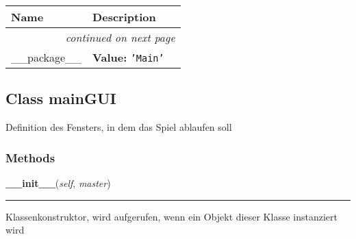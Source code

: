     \vspace{-1cm}
\hspace{\varindent}\begin{longtable}{|p{\varnamewidth}|p{\vardescrwidth}|l}
\cline{1-2}
\cline{1-2} \centering \textbf{Name} & \centering \textbf{Description}& \\
\cline{1-2}
\endhead\cline{1-2}\multicolumn{3}{r}{\small\textit{continued on next page}}\\\endfoot\cline{1-2}
\endlastfoot\raggedright \_\-\_\-p\-a\-c\-k\-a\-g\-e\-\_\-\_\- & \raggedright \textbf{Value:} 
{\tt \texttt{'}\texttt{Main}\texttt{'}}&\\
\cline{1-2}
\end{longtable}



\subsection{Class mainGUI}

    \label{Main:main:mainGUI}
Definition des Fensters, in dem das Spiel ablaufen soll



  \subsubsection{Methods}

    \label{Main:main:mainGUI:__init__}

    \vspace{0.5ex}

\hspace{.8\funcindent}\begin{boxedminipage}{\funcwidth}

    \raggedright \textbf{\_\_init\_\_}(\textit{self}, \textit{master})

    \vspace{-1.5ex}

    \rule{\textwidth}{0.5\fboxrule}
\setlength{\parskip}{2ex}
    Klassenkonstruktor, wird aufgerufen, wenn ein Objekt dieser Klasse 
    instanziert wird

\setlength{\parskip}{1ex}
    \end{boxedminipage}

